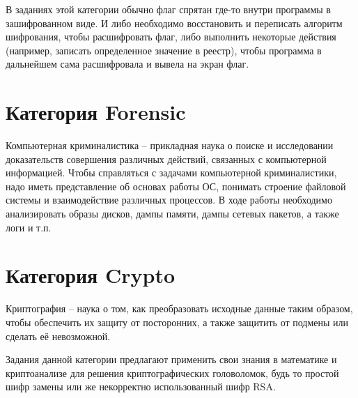 В заданиях этой категории обычно флаг спрятан где-то внутри программы в зашифрованном виде. И либо необходимо восстановить и переписать алгоритм шифрования, чтобы расшифровать флаг, либо выполнить некоторые действия (например, записать определенное значение в реестр), чтобы программа в дальнейшем сама расшифровала и вывела на экран флаг.










\section{Категория Forensic}

Компьютерная криминалистика – прикладная наука о поиске и исследовании доказательств совершения различных действий, связанных с компьютерной информацией.
Чтобы справляться с задачами компьютерной криминалистики, надо иметь представление об основах работы ОС, понимать строение файловой системы и взаимодействие различных процессов. В ходе работы необходимо анализировать образы дисков, дампы памяти, дампы сетевых пакетов, а также логи и т.п.







\section{Категория Crypto}

Криптография – наука о том, как преобразовать исходные данные таким образом, чтобы обеспечить их защиту от посторонних, а также защитить от подмены или сделать её невозможной.

Задания данной категории предлагают применить свои знания в математике и криптоанализе для решения криптографических головоломок, будь то простой шифр замены или же некорректно использованный шифр RSA.







